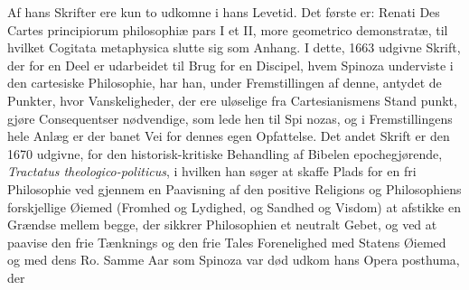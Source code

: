 \documentclass[12pt,a4paper]{book}
\begin{document}
Af hans Skrifter ere kun to udkomne i hans Levetid.
Det første er: Renati Des Cartes principiorum philosophiæ
pars I et II, more geometrico demonstratæ, til hvilket Cogitata
metaphysica slutte sig som Anhang. I dette, 1663 udgivne
Skrift, der for en Deel er udarbeidet til Brug for en Discipel,
hvem Spinoza underviste i den cartesiske Philosophie, har han,
under Fremstillingen af denne, antydet de Punkter, hvor
Vanskeligheder, der ere uløselige fra Cartesianismens Stand\-%
punkt, gjøre Consequentser nødvendige, som lede hen til Spi\-%
nozas, og i Fremstillingens hele Anlæg er der banet Vei for
dennes egen Opfattelse. Det andet Skrift er den 1670 udgivne,
for den historisk-kritiske Behandling af Bibelen epochegjørende,
\emph{Tractatus theologico-politicus}, i hvilken han søger at
skaffe Plads for en fri Philosophie ved gjennem en Paavisning
af den positive Religions og Philosophiens forskjellige Øiemed
(Fromhed og Lydighed, og Sandhed og Visdom) at afstikke
en Grændse mellem begge, der sikkrer Philosophien et neutralt
Gebet, og ved at paavise den frie Tænknings og den frie Tales
Forenelighed med Statens Øiemed og med dens Ro. Samme
Aar som Spinoza var død udkom hans Opera posthuma, der
\end{document}
